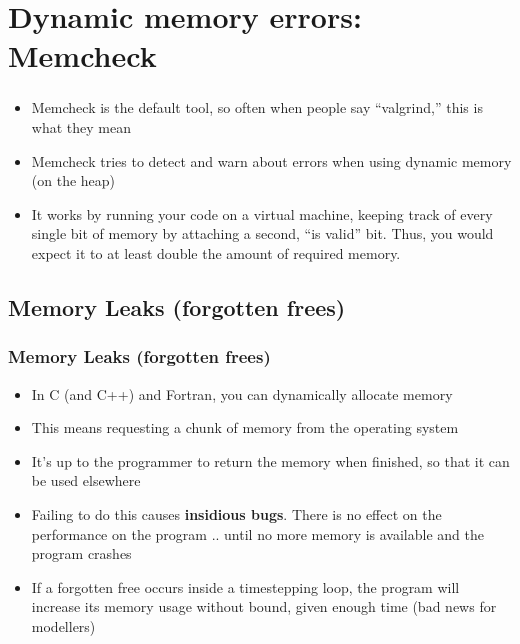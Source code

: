 \documentclass{beamer}
\begin{document}
\section{Dynamic memory errors: Memcheck}
\begin{frame}[fragile]
  \frametitle{}

\begin{itemize}
  \item Memcheck is the default tool, so often when people say ``valgrind,'' this is what they mean
  \item Memcheck tries to detect and warn about errors when using dynamic memory (on the heap)
  \item It works by running your code on a virtual machine, keeping track of every single bit of memory by attaching a second, ``is valid'' bit. Thus, you would expect it to at least double the amount of required memory.
\end{itemize}
\end{frame}


\subsection{Memory Leaks (forgotten frees)}

\begin{frame}[fragile]
  \frametitle{Memory Leaks (forgotten frees)}
  \begin{itemize}
    \item In C (and C++) and Fortran, you can dynamically allocate memory
      \item This means requesting a chunk of memory from the operating system
      \item It's up to the programmer to return the memory when finished, so that it can be used elsewhere
      \item Failing to do this causes {\bf insidious bugs}. There is no effect on the performance on the program .. until no more memory is available and the program crashes
      \item If a forgotten free occurs inside a timestepping loop, the program will increase its memory usage without bound, given enough time (bad news for modellers)
  \end{itemize}
\end{frame}
\end{document}

